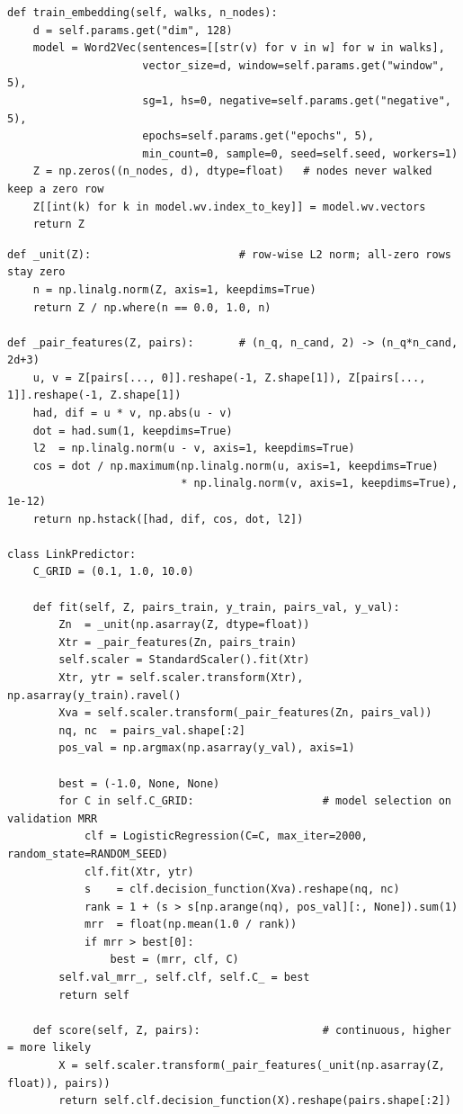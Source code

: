 \begin{lstlisting}[style=p1code,caption={TODO 2 --- \texttt{train\_embedding}}]
def train_embedding(self, walks, n_nodes):
    d = self.params.get("dim", 128)
    model = Word2Vec(sentences=[[str(v) for v in w] for w in walks],
                     vector_size=d, window=self.params.get("window", 5),
                     sg=1, hs=0, negative=self.params.get("negative", 5),
                     epochs=self.params.get("epochs", 5),
                     min_count=0, sample=0, seed=self.seed, workers=1)
    Z = np.zeros((n_nodes, d), dtype=float)   # nodes never walked keep a zero row
    Z[[int(k) for k in model.wv.index_to_key]] = model.wv.vectors
    return Z
\end{lstlisting}

\begin{lstlisting}[style=p1code,caption={TODO 3a --- \texttt{LinkPredictor} (and the pair feature map)}]
def _unit(Z):                       # row-wise L2 norm; all-zero rows stay zero
    n = np.linalg.norm(Z, axis=1, keepdims=True)
    return Z / np.where(n == 0.0, 1.0, n)

def _pair_features(Z, pairs):       # (n_q, n_cand, 2) -> (n_q*n_cand, 2d+3)
    u, v = Z[pairs[..., 0]].reshape(-1, Z.shape[1]), Z[pairs[..., 1]].reshape(-1, Z.shape[1])
    had, dif = u * v, np.abs(u - v)
    dot = had.sum(1, keepdims=True)
    l2  = np.linalg.norm(u - v, axis=1, keepdims=True)
    cos = dot / np.maximum(np.linalg.norm(u, axis=1, keepdims=True)
                           * np.linalg.norm(v, axis=1, keepdims=True), 1e-12)
    return np.hstack([had, dif, cos, dot, l2])

class LinkPredictor:
    C_GRID = (0.1, 1.0, 10.0)

    def fit(self, Z, pairs_train, y_train, pairs_val, y_val):
        Zn  = _unit(np.asarray(Z, dtype=float))
        Xtr = _pair_features(Zn, pairs_train)
        self.scaler = StandardScaler().fit(Xtr)
        Xtr, ytr = self.scaler.transform(Xtr), np.asarray(y_train).ravel()
        Xva = self.scaler.transform(_pair_features(Zn, pairs_val))
        nq, nc  = pairs_val.shape[:2]
        pos_val = np.argmax(np.asarray(y_val), axis=1)

        best = (-1.0, None, None)
        for C in self.C_GRID:                    # model selection on validation MRR
            clf = LogisticRegression(C=C, max_iter=2000, random_state=RANDOM_SEED)
            clf.fit(Xtr, ytr)
            s    = clf.decision_function(Xva).reshape(nq, nc)
            rank = 1 + (s > s[np.arange(nq), pos_val][:, None]).sum(1)
            mrr  = float(np.mean(1.0 / rank))
            if mrr > best[0]:
                best = (mrr, clf, C)
        self.val_mrr_, self.clf, self.C_ = best
        return self

    def score(self, Z, pairs):                   # continuous, higher = more likely
        X = self.scaler.transform(_pair_features(_unit(np.asarray(Z, float)), pairs))
        return self.clf.decision_function(X).reshape(pairs.shape[:2])
\end{lstlisting}

